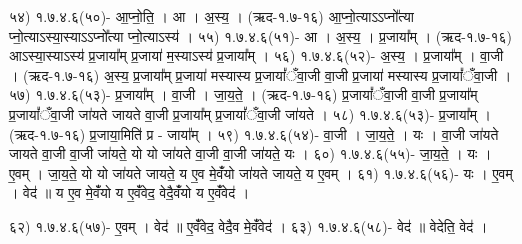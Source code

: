५४)      १.७.४.६(५०)-          आ॒प्नो॒ति॒ । आ । अ॒स्य॒ । (ऋद-१.७-१६)
आ॒प्नो॒त्याऽऽप्नो᳚त्या प्नो॒त्याऽस्या॒स्याऽऽप्नो᳚त्या प्नो॒त्याऽस्य॑ ।
५५)      १.७.४.६(५१)-          आ । अ॒स्य॒ । प्र॒जाया᳚म् । (ऋद-१.७-१६)
आऽस्या॒स्याऽस्य॑ प्र॒जाया᳚म् प्र॒जाया॑ म॒स्याऽस्य॑ प्र॒जाया᳚म् ।
५६)      १.७.४.६(५२)-          अ॒स्य॒ । प्र॒जाया᳚म् । वा॒जी । (ऋद-१.७-१६)
अ॒स्य॒ प्र॒जाया᳚म् प्र॒जाया॑ मस्यास्य प्र॒जायां᳚ँवा॒जी वा॒जी प्र॒जाया॑ मस्यास्य प्र॒जायां᳚ँवा॒जी ।
५७)      १.७.४.६(५३)-          प्र॒जाया᳚म् । वा॒जी । जा॒य॒ते॒ । (ऋद-१.७-१६)
प्र॒जायां᳚ँवा॒जी वा॒जी प्र॒जाया᳚म् प्र॒जायां᳚ँवा॒जी जा॑यते जायते वा॒जी प्र॒जाया᳚म् प्र॒जायां᳚ँवा॒जी
जा॑यते ।
५८)      १.७.४.६(५३)-          प्र॒जाया᳚म् । (ऋद-१.७-१६)
प्र॒जाया॒मिति॑ प्र - जाया᳚म् ।
५९)      १.७.४.६(५४)-          वा॒जी । जा॒य॒ते॒ । यः ।
वा॒जी जा॑यते जायते वा॒जी वा॒जी जा॑यते॒ यो यो जा॑यते वा॒जी वा॒जी जा॑यते॒ यः ।
६०)      १.७.४.६(५५)-          जा॒य॒ते॒ । यः । ए॒वम् ।
जा॒य॒ते॒ यो यो जा॑यते जायते॒ य ए॒व मे॒वंँयो जा॑यते जायते॒ य ए॒वम् ।
६१)      १.७.४.६(५६)-          यः । ए॒वम् । वेद॑ ॥
य ए॒व मे॒वंँयो य ए॒वंँवेद॒ वेदै॒वंँयो य ए॒वंँवेद॑ ।




६२)      १.७.४.६(५७)-           ए॒वम् । वेद॑ ॥
ए॒वंँवेद॒ वेदै॒व मे॒वंँवेद॑ ।
६३)      १.७.४.६(५८)-           वेद॑ ॥
वेदेति॒ वेद॑ ।

